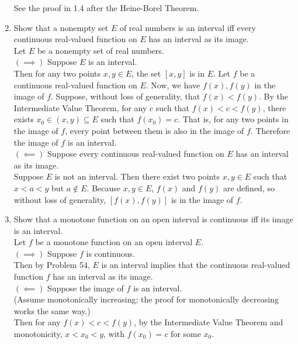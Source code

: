 \begin{enumerate}
	See the proof in 1.4 after the Heine-Borel Theorem.
	\item Show that a nonempty set $E$ of real numbers is an interval iff every continuous real-valued function on $E$ has an interval as its image.\\
	Let $E$ be a nonempty set of real numbers.\\
	$(\implies)$ Suppose $E$ is an interval.\\
	Then for any two points $x,y\in E$, the set $[x,y]$ is in $E$.
	Let $f$ be a continuous real-valued function on $E$.
	Now, we have $f(x),f(y)$ in the image of $f$.
	Suppose, without loss of generality, that $f(x)<f(y)$.
	By the Intermediate Value Theorem, for any $c$ such that $f(x)<c<f(y)$, there exists $x_0\in(x,y)\subseteq E$ such that $f(x_0)=c$.
	That is, for any two points in the image of $f$, every point between them is also in the image of $f$.
	Therefore the image of $f$ is an interval.\\
	$(\impliedby)$ Suppose every continuous real-valued function on $E$ has an interval as its image.\\
	Suppose $E$ is not an interval.
	Then there exist two points $x,y\in E$ such that $x<a<y$ but $a \notin E$.
	Because $x,y\in E$, $f(x)$ and $f(y)$ are defined, so without loss of generality, $[f(x),f(y)]$ is in the image of $f$.
	
	\item Show that a monotone function on an open interval is continuous iff its image is an interval.\\
	Let $f$ be a monotone function on an open interval $E$.\\
	$(\implies)$ Suppose $f$ is continuous.\\
	Then by Problem 54, $E$ is an interval implies that the continuous real-valued function $f$ has an interval as its image.\\
	$(\impliedby)$ Suppose the image of $f$ is an interval.\\
	(Assume monotonically increasing; the proof for monotonically decreasing works the same way.)\\
	Then for any $f(x)<c<f(y)$, by the Intermediate Value Theorem and monotonicity, $x<x_0<y$, with $f(x_0)=c$ for some $x_0$.


\end{enumerate}
